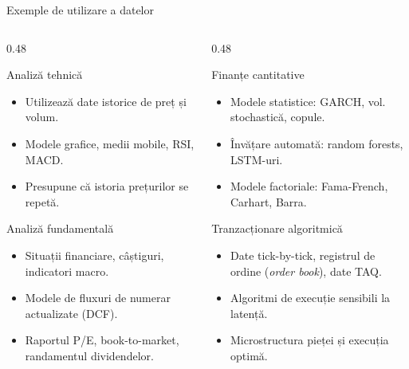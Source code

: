 \documentclass[9pt, aspectratio=169, t]{beamer}
\theoremstyle{definition}
\begin{document}
\begin{frame}{Exemple de utilizare a datelor}
\begin{columns}[T]
\begin{column}{0.48\textwidth}
\begin{block}{Analiză tehnică}
\begin{itemize}
    \item Utilizează date istorice de preț și volum.
    \item Modele grafice, medii mobile, RSI, MACD.
    \item Presupune că istoria prețurilor se repetă.
\end{itemize}
\end{block}
\vspace{0.15cm}
\begin{block}{Analiză fundamentală}
\begin{itemize}
    \item Situații financiare, câștiguri, indicatori macro.
    \item Modele de fluxuri de numerar actualizate (DCF).
    \item Raportul P/E, book-to-market, randamentul dividendelor.
\end{itemize}
\end{block}
\end{column}
\begin{column}{0.48\textwidth}
\begin{block}{Finanțe cantitative}
\begin{itemize}
    \item Modele statistice: GARCH, vol. stochastică, copule.
    \item Învățare automată: random forests, LSTM-uri.
    \item Modele factoriale: Fama-French, Carhart, Barra.
\end{itemize}
\end{block}
\vspace{0.15cm}
\begin{block}{Tranzacționare algoritmică}
\begin{itemize}
    \item Date tick-by-tick, registrul de ordine (\textit{order book}), date TAQ.
    \item Algoritmi de execuție sensibili la latență.
    \item Microstructura pieței și execuția optimă.
\end{itemize}
\end{block}
\end{column}
\end{columns}
\end{frame}
\end{document}
